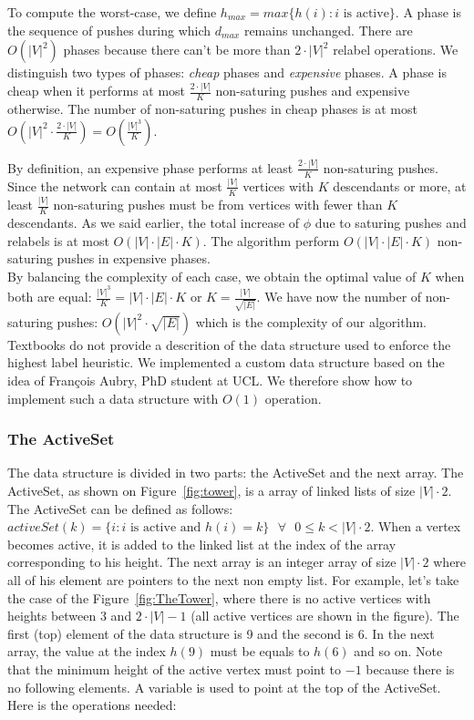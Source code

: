 To compute the worst-case, we define $h_{max} = max\{h(i) : i\text{ is active}\}$. A phase is the sequence of pushes during which $d_{max}$ remains unchanged. There are $O(|V|^2)$ phases because there can't be more than $2\cdot|V|^2$ relabel operations. We distinguish two types of phases: \textit{cheap} phases and \textit{expensive} phases. A phase is cheap when it performs at most $\frac{2\cdot|V|}{K}$ non-saturing pushes and expensive otherwise. The number of non-saturing pushes in cheap phases is at most $O(|V|^2 \cdot \frac{2\cdot|V|}{K}) = O(\frac{|V|^3}{K})$.

By definition, an expensive phase performs at least $\frac{2\cdot|V|}{K}$ non-saturing pushes. Since the network can contain at most $\frac{|V|}{K}$ vertices with $K$ descendants or more, at least $\frac{|V|}{K}$ non-saturing pushes must be from vertices with fewer than $K$ descendants. As we said earlier, the total increase of $\phi$ due to saturing pushes and relabels is at most $O(|V|\cdot|E|\cdot K)$. The algorithm perform $O(|V|\cdot|E|\cdot K)$ non-saturing pushes in expensive phases.\\

By balancing the complexity of each case, we obtain the optimal value of $K$ when both are equal: $\frac{|V|^3}{K} = |V|\cdot|E|\cdot K$ or $K = \frac{|V|}{\sqrt{|E|}}$. We have now the number of non-saturing pushes: $O(|V|^2\cdot\sqrt{|E|})$ which is the complexity of our algorithm.\\

Textbooks do not provide a descrition of the data structure used to enforce the highest label heuristic. We implemented a custom data structure based on the idea of Fran\c cois Aubry, PhD student at UCL. We therefore show how to implement such a data structure with $O(1)$ operation.

\subsubsection{The ActiveSet}

The data structure is divided in two parts: the ActiveSet and the next array. The ActiveSet, as shown on Figure~\ref{fig:tower}, is a array of linked lists of size $|V|\cdot 2$. The ActiveSet can be defined as follows: $activeSet(k) = \{i : i \text{ is active and } h(i) = k\} \text{ } \forall \text{ } 0 \le k < |V|\cdot 2$. When a vertex becomes active, it is added to the linked list at the index of the array corresponding to his height. The next array is an integer array of size $|V| \cdot 2$ where all of his element are pointers to the next non empty list. For example, let's take the case of the Figure~\ref{fig:TheTower}, where there is no active vertices with heights between 3 and $2 \cdot |V|-1$ (all active vertices are shown in the figure). The first (top) element of the data structure is 9 and the second is 6. In the next array, the value at the index $h(9)$ must be equals to $h(6)$ and so on. Note that the minimum height of the active vertex must point to $-1$ because there is no following elements. A variable is used to point at the top of the ActiveSet. Here is the operations needed:

